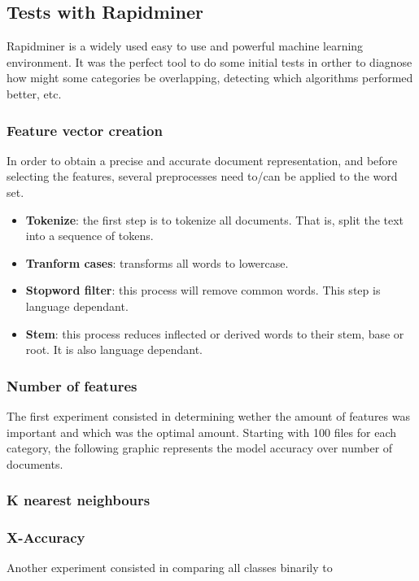 \subsection{Tests with Rapidminer}
Rapidminer\cite{rapidminer} is a widely used easy to use and powerful machine learning environment.  
It was the perfect tool to do some initial tests in orther to diagnose how might some categories be overlapping, detecting which algorithms performed better, etc.

\subsubsection{Feature vector creation}
In order to obtain a precise and accurate document representation, and before selecting the features, several preprocesses need to/can be applied to the word set.
\begin{itemize}
  \item {\bf Tokenize}: the first step is to tokenize all documents. That is, split the text into a sequence of tokens. 
  \item {\bf Tranform cases}: transforms all words to lowercase.
  \item {\bf Stopword filter}: this process will remove common words. This step is language dependant.
  \item {\bf Stem}: this process reduces inflected or derived words to their stem, base or root. It is also language dependant.
\end{itemize}



\subsubsection{Number of features}
The first experiment consisted in determining wether the amount of features was important and which was the optimal amount. Starting with 100 files for each category, the following graphic
represents the model accuracy over number of documents. 

\subsubsection{K nearest neighbours}

\subsubsection{X-Accuracy}
Another experiment consisted in comparing all classes binarily to  

